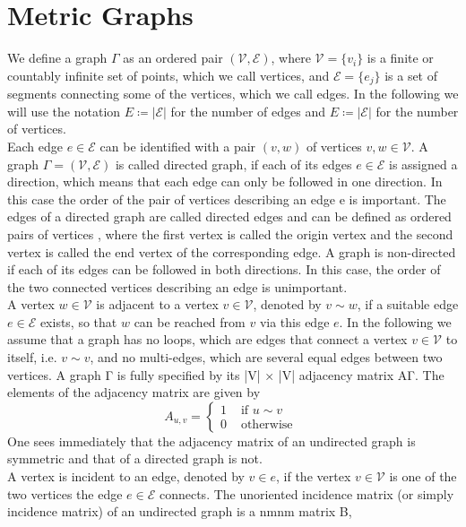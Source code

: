 \section{Metric Graphs}

We define a graph $\Gamma$ as an ordered pair $(\mathcal{V}, \mathcal{E})$, where $\mathcal{V} = \{v_i\}$ is a finite or countably infinite set of points, which we call vertices, and $\mathcal{E} = \{e_j\}$ is a set of segments connecting some of the vertices, which we call edges. In the following we will use the notation $E \coloneqq \left\lvert \mathcal{E} \right\rvert$ for the number of edges and $E \coloneqq \left\lvert \mathcal{E} \right\rvert$ for the number of vertices. \\
Each edge $e \in \mathcal{E}$ can be identified with a pair $(v, w)$ of vertices $v, w \in \mathcal{V}$. A graph $\Gamma = (\mathcal{V}, \mathcal{E})$ is called directed graph, if each of its edges $e \in \mathcal{E}$ is assigned a direction, which means that each edge can only be followed in one direction. In this case the order of the pair of vertices describing an edge e is important. The edges of a directed graph are called directed edges and can be defined as ordered pairs of vertices , where the first vertex is called the origin vertex and the second vertex is called the end vertex of the corresponding edge. A graph is non-directed if each of its edges can be followed in both directions. In this case, the order of the two connected vertices describing an edge is unimportant. \\
A vertex $w \in \mathcal{V}$ is adjacent to a vertex $v \in \mathcal{V}$, denoted by $v \sim w$, if a suitable edge $e \in \mathcal{E}$ exists, so that $w$ can be reached from $v$ via this edge $e$. In the following we assume that a graph has no loops, which are edges that connect a vertex $v \in \mathcal{V}$ to itself, i.e. $v \sim v$, and no multi-edges, which are several equal edges between two vertices. A graph Γ is fully specified by its |V| × |V| adjacency matrix AΓ. The elements of the adjacency matrix are given by
\begin{equation}
    \label{adjacency matrix}
    A_{u, v}= \begin{cases}1 & \text { if } u \sim v \\ 0 & \text { otherwise } \end{cases}
\end{equation}
One sees immediately that the adjacency matrix of an undirected graph is symmetric and that of a directed graph is not. \\
A vertex is incident to an edge, denoted by $v \in e$, if the vertex $v \in \mathcal{V}$ is one of the two vertices the edge $e \in \mathcal{E}$ connects. %
The unoriented incidence matrix (or simply incidence matrix) of an undirected graph is a {\displaystyle n\times m}n\times m matrix B,




